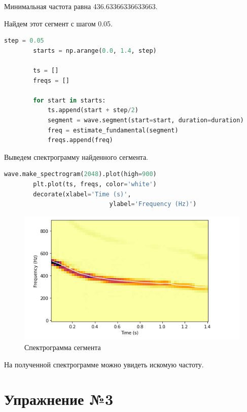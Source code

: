 \documentclass[a4paper, 14pt]{extarticle}
\begin{document}
    Минимальная частота равна 436.63366336633663.

    Найдем этот сегмент с шагом 0.05.

    \begin{lstlisting}[language=Python, caption= Поиск сегмента с минимальной частотой, label={lst:find_segment}]
        step = 0.05
        starts = np.arange(0.0, 1.4, step)

        ts = []
        freqs = []

        for start in starts:
            ts.append(start + step/2)
            segment = wave.segment(start=start, duration=duration)
            freq = estimate_fundamental(segment)
            freqs.append(freq)
    \end{lstlisting}

    Выведем спектрограмму найденного сегмента.

    \begin{lstlisting}[language=Python, caption= Спектрограмма сегмента, label={lst:spectrogram_segment}]
        wave.make_spectrogram(2048).plot(high=900)
        plt.plot(ts, freqs, color='white')
        decorate(xlabel='Time (s)',
                             ylabel='Frequency (Hz)')
    \end{lstlisting}

    \begin{figure}[H]
        \centering
        \includegraphics[width=0.8\linewidth]{segment_spectrogram}
        \caption{Спектрограмма сегмента}
        \label{fig:segment_spectrogram}
    \end{figure}

    На полученной спектрограмме можно увидеть искомую частоту.

    \newpage


    \section{Упражнение №3}
    \label{sec:3}
\end{document}
